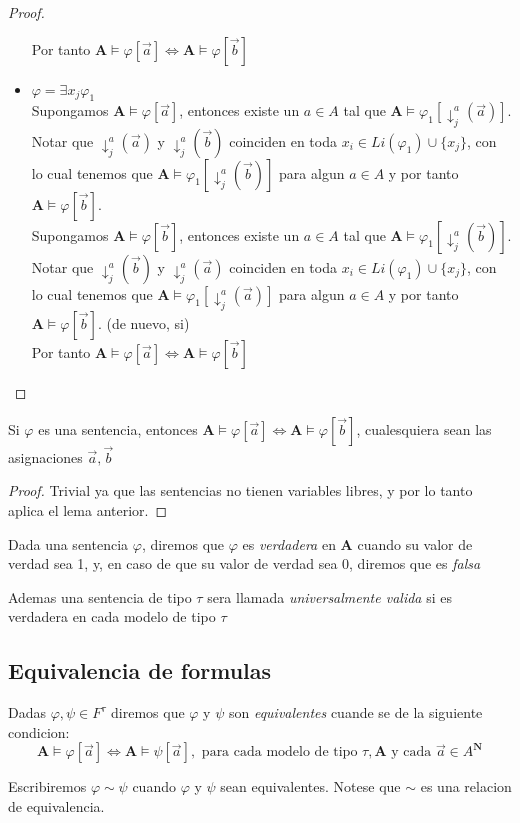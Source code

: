 \begin{proof}
\begin{itemize}
    Por tanto $\mathbf{A}\models\varphi[\vec{a}]\iff\mathbf{A}\models\varphi[\vec{b}]$
    \item $\varphi = \exists x_j \varphi_1$\\
    Supongamos $\mathbf{A}\models\varphi[\vec{a}]$, entonces existe un $a \in A$ tal que $\mathbf{A}\models\varphi_1[\downarrow_j^a(\vec{a})]$. Notar que 
    $\downarrow_j^a(\vec{a})$ y $\downarrow_j^a(\vec{b})$ coinciden en toda $x_i \in Li(\varphi_1)\cup\{x_j\}$, con lo cual tenemos que $\mathbf{A}\models\varphi_1[\downarrow_j^a(\vec{b})]$ para algun $a \in A$ y por tanto $\mathbf{A}\models\varphi[\vec{b}]$. \\
    Supongamos $\mathbf{A}\models\varphi[\vec{b}]$, entonces existe un $a \in A$ tal que $\mathbf{A}\models\varphi_1[\downarrow_j^a(\vec{b})]$. Notar que 
    $\downarrow_j^a(\vec{b})$ y $\downarrow_j^a(\vec{a})$ coinciden en toda $x_i \in Li(\varphi_1)\cup\{x_j\}$, con lo cual tenemos que $\mathbf{A}\models\varphi_1[\downarrow_j^a(\vec{a})]$ para algun $a \in A$ y por tanto $\mathbf{A}\models\varphi[\vec{b}]$. (de nuevo, si)\\
    Por tanto $\mathbf{A}\models\varphi[\vec{a}]\iff\mathbf{A}\models\varphi[\vec{b}]$
  \end{itemize}
\end{proof}
\begin{corollary}
  Si $\varphi$ es una sentencia, entonces $\mathbf{A}\models\varphi[\vec{a}] \iff \mathbf{A}\models\varphi[\vec{b}]$, cualesquiera sean 
  las asignaciones $\vec{a}, \vec{b}$
\end{corollary}
\begin{proof}
  Trivial ya que las sentencias no tienen variables libres, y por lo tanto aplica el lema anterior.
\end{proof}

\begin{definition}
  Dada una sentencia $\varphi$, diremos que $\varphi$ es \emph{verdadera} en $\mathbf{A}$ cuando su valor de verdad sea 1, y, en caso de que 
  su valor de verdad sea 0, diremos que es \emph{falsa}

  Ademas una sentencia de tipo $\tau$ sera llamada \emph{universalmente valida} si es verdadera en cada modelo de tipo $\tau$
\end{definition}

\subsection{Equivalencia de formulas}
\begin{definition}
  Dadas $\varphi, \psi \in F^\tau$ diremos que $\varphi$ y $\psi$ son \emph{equivalentes} cuande se de la siguiente condicion:
  $$
  \mathbf{A} \models \varphi[\vec{a}] \iff \mathbf{A} \models \psi[\vec{a}], \text{ para cada modelo de tipo } \tau, \mathbf{A} \text{ y cada } \vec{a} \in A^\mathbf{N}
  $$  
  
  Escribiremos $\varphi \sim \psi$ cuando $\varphi$ y $\psi$ sean equivalentes. Notese que $\sim$ es una relacion de equivalencia.
\end{definition}

